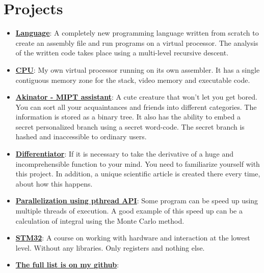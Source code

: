 \documentclass{resume}
\newcommand{\resumeItem}[2]{
  \item\small{
    \textbf{#1}{: #2 \vspace{-2pt}}
  }
}
\newcommand{\resumeSubItem}[2]{\resumeItem{#1}{#2}\vspace{-4pt}}
\newcommand{\resumeSubHeadingListStart}{\begin{itemize}[leftmargin=*]}
\newcommand{\resumeSubHeadingListEnd}{\end{itemize}}
\begin{document}
\section{Projects}
  \resumeSubHeadingListStart
    \resumeSubItem{\href{https://github.com/UniverTime/Language}{Language}}
      {A completely new programming language written from scratch to create an assembly file and run programs on a virtual processor. The analysis of the written code takes place using a multi-level recursive descent.}
      \bigskip
    \resumeSubItem{\href{https://github.com/UniverTime/CPU}{CPU}}
    {My own virtual processor running on its own assembler. It has a single contiguous memory zone for the stack, video memory and executable code.}
    \bigskip
    \resumeSubItem{\href{https://github.com/UniverTime/Akinator}{Akinator - MIPT assistant}}
      {A cute creature that won't let you get bored. You can sort all your acquaintances and friends into different categories. The information is stored as a binary tree. It also has the ability to embed a secret personalized branch using a secret word-code. The secret branch is hashed and inaccessible to ordinary users.}
      \bigskip
    \resumeSubItem{\href{https://github.com/UniverTime/Differentiator}{Differentiator}}
      {If it is necessary to take the derivative of a huge and incomprehensible function to your mind. You need to familiarize yourself with this project. In addition, a unique scientific article is created there every time, about how this happens.}
      \bigskip
    \resumeSubItem{\href{https://github.com/UniverTime/Parallelization}{Parallelization using pthread API}}
      {Some program can be speed up using multiple threads of execution. A good example of this speed up can be a calculation of integral using the Monte Carlo method.}
      \bigskip
    \resumeSubItem{\href{https://github.com/UniverTime/STM32}{STM32}}
      {A course on working with hardware and interaction at the lowest level. Without any libraries. Only registers and nothing else.}
      \bigskip
      \resumeSubItem{\href{https://github.com/UniverTime}{The full list is on my github}}
      {}
      
  \resumeSubHeadingListEnd
\end{document}
